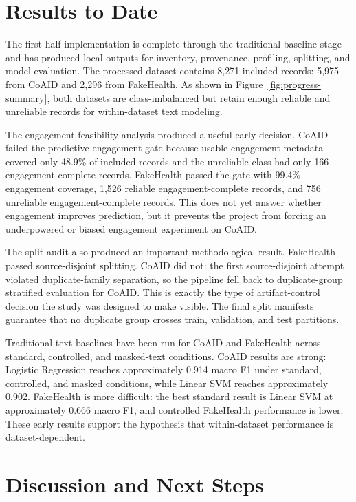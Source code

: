 \documentclass[12pt]{article}
\begin{document}
\section*{Results to Date}

The first-half implementation is complete through the traditional baseline stage and has produced local outputs for inventory, provenance, profiling, splitting, and model evaluation. The processed dataset contains 8,271 included records: 5,975 from CoAID and 2,296 from FakeHealth. As shown in Figure~\ref{fig:progress-summary}, both datasets are class-imbalanced but retain enough reliable and unreliable records for within-dataset text modeling.

The engagement feasibility analysis produced a useful early decision. CoAID failed the predictive engagement gate because usable engagement metadata covered only 48.9\% of included records and the unreliable class had only 166 engagement-complete records. FakeHealth passed the gate with 99.4\% engagement coverage, 1,526 reliable engagement-complete records, and 756 unreliable engagement-complete records. This does not yet answer whether engagement improves prediction, but it prevents the project from forcing an underpowered or biased engagement experiment on CoAID.

The split audit also produced an important methodological result. FakeHealth passed source-disjoint splitting. CoAID did not: the first source-disjoint attempt violated duplicate-family separation, so the pipeline fell back to duplicate-group stratified evaluation for CoAID. This is exactly the type of artifact-control decision the study was designed to make visible. The final split manifests guarantee that no duplicate group crosses train, validation, and test partitions.

Traditional text baselines have been run for CoAID and FakeHealth across standard, controlled, and masked-text conditions. CoAID results are strong: Logistic Regression reaches approximately 0.914 macro F1 under standard, controlled, and masked conditions, while Linear SVM reaches approximately 0.902. FakeHealth is more difficult: the best standard result is Linear SVM at approximately 0.666 macro F1, and controlled FakeHealth performance is lower. These early results support the hypothesis that within-dataset performance is dataset-dependent.

\section*{Discussion and Next Steps}
\end{document}

